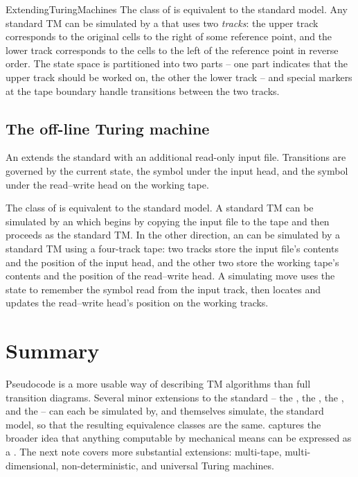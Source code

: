 \documentclass[hidelinks]{article}
\begin{document}
\begin{smodule}[title={Extending Turing Machine Definitions}]{ExtendingTuringMachines}
The class of  is equivalent to the standard model. Any standard TM can be simulated by a  that uses two \emph{tracks}: the upper track corresponds to the original cells to the right of some reference point, and the lower track corresponds to the cells to the left of the reference point in reverse order. The state space is partitioned into two parts -- one part indicates that the upper track should be worked on, the other the lower track -- and special markers at the tape boundary handle transitions between the two tracks.

\subsection{The off-line Turing machine}

\begin{sdefinition}[for=off-line Turing machine]
An  extends the standard  with an additional read-only input file. Transitions are governed by the current state, the symbol under the input head, and the symbol under the read--write head on the working tape.
\end{sdefinition}

The class of  is equivalent to the standard model. A standard TM can be simulated by an  which begins by copying the input file to the tape and then proceeds as the standard TM. In the other direction, an  can be simulated by a standard TM using a four-track tape: two tracks store the input file's contents and the position of the input head, and the other two store the working tape's contents and the position of the read--write head. A simulating move uses the state to remember the symbol read from the input track, then locates and updates the read--write head's position on the working tracks.

\section{Summary}

Pseudocode is a more usable way of describing TM algorithms than full transition diagrams. Several minor extensions to the standard  -- the , the , the , and the  -- can each be simulated by, and themselves simulate, the standard model, so that the resulting equivalence classes are the same.  captures the broader idea that anything computable by mechanical means can be expressed as a . The next note covers more substantial extensions: multi-tape, multi-dimensional, non-deterministic, and universal Turing machines.

\end{smodule}
\end{document}
